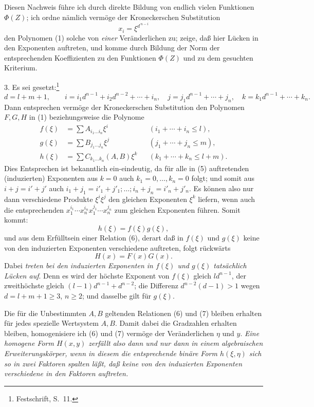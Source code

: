 \documentclass[11pt]{article}
\begin{document}
Diesen Nachweis führe ich durch direkte Bildung von endlich vielen Funktionen $\Phi(Z)$; ich ordne nämlich vermöge der Kroneckerschen Substitution
\[
 x_i=\xi^{d^{\,n-i}}
\]
den Polynomen (1) solche von \emph{einer} Veränderlichen zu; zeige, daß hier Lücken in den Exponenten auftreten, und komme durch Bildung der Norm der entsprechenden Koeffizienten zu den Funktionen $\Phi(Z)$ und zu dem gesuchten Kriterium.

3. Es sei gesetzt:\footnote{Festschrift, S.~11.}
\begin{equation}
 d=l+m+1,\qquad
 i=i_1d^{n-1}+i_2d^{n-2}+\cdots+i_n,
\quad
 j=j_1d^{n-1}+\cdots+j_n,
\quad
 k=k_1d^{n-1}+\cdots+k_n.
\tag{4}
\end{equation}
Dann entsprechen vermöge der Kroneckerschen Substitution den Polynomen $F,G,H$ in (1) beziehungsweise die Polynome
\begin{equation}
\begin{aligned}
 f(\xi)&=\sum A_{i_1\ldots i_n}\xi^i &&(i_1+\cdots+i_n\le l),\\
 g(\xi)&=\sum B_{j_1\ldots j_n}\xi^j &&(j_1+\cdots+j_n\le m),\\
 h(\xi)&=\sum C_{k_1\ldots k_n}(A,B)\xi^k &&(k_1+\cdots+k_n\le l+m).
\end{aligned}
\tag{5}
\end{equation}
Dies Entsprechen ist bekanntlich ein-eindeutig, da für alle in (5) auftretenden (induzierten) Exponenten aus $k=0$ auch $k_1=0,\ldots,k_n=0$ folgt; und somit aus $i+j=i'+j'$ auch $i_1+j_1=i'_1+j'_1;\ldots;i_n+j_n=i'_n+j'_n$. Es können also nur dann verschiedene Produkte $\xi^i\xi^j$ den gleichen Exponenten $\xi^k$ liefern, wenn auch die entsprechenden $x_1^{i_1}\cdots x_n^{i_n}x_1^{j_1}\cdots x_n^{j_n}$ zum gleichen Exponenten führen. Somit kommt:
\begin{equation}
 h(\xi)=f(\xi)g(\xi),
\tag{6}
\end{equation}
und aus dem Erfülltsein einer Relation (6), derart daß in $f(\xi)$ und $g(\xi)$ keine von den induzierten Exponenten verschiedene auftreten, folgt rückwärts
\begin{equation}
 H(x)=F(x)G(x).
\tag{7}
\end{equation}
Dabei \emph{treten bei den induzierten Exponenten in $f(\xi)$ und $g(\xi)$ tatsächlich Lücken auf}. Denn es wird der höchste Exponent von $f(\xi)$ gleich $ld^{n-1}$, der zweithöchste gleich $(l-1)d^{n-1}+d^{n-2}$; die Differenz $d^{n-2}(d-1)>1$ wegen $d=l+m+1\ge3$, $n\ge2$; und dasselbe gilt für $g(\xi)$.

Die für die Unbestimmten $A,B$ geltenden Relationen (6) und (7) bleiben erhalten für jedes spezielle Wertsystem $A,B$. Damit dabei die Gradzahlen erhalten bleiben, homogenisiere ich (6) und (7) vermöge der Veränderlichen $\eta$ und $y$. \emph{Eine homogene Form $H(x,y)$ zerfällt also dann und nur dann in einem algebraischen Erweiterungskörper, wenn in diesem die entsprechende binäre Form $h(\xi,\eta)$ sich so in zwei Faktoren spalten läßt, daß keine von den induzierten Exponenten verschiedene in den Faktoren auftreten.}
\end{document}

